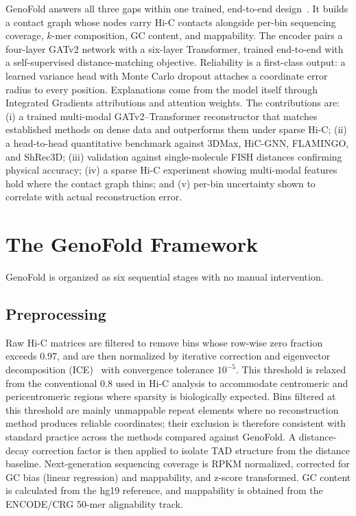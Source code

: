 \documentclass[conference]{IEEEtran}
\begin{document}
GenoFold answers all three gaps within one trained, end-to-end
design~\cite{genofold2025}. It builds a contact graph whose nodes carry
Hi-C contacts alongside per-bin sequencing coverage, $k$-mer
composition, GC content, and mappability. The encoder pairs a four-layer
GATv2 network with a six-layer Transformer, trained end-to-end with a
self-supervised distance-matching objective. Reliability is a
first-class output: a learned variance head with Monte Carlo dropout
attaches a coordinate error radius to every position. Explanations come
from the model itself through Integrated Gradients attributions and
attention weights. The contributions are: (i) a trained multi-modal
GATv2--Transformer reconstructor that matches established methods on
dense data and outperforms them under sparse Hi-C; (ii) a head-to-head
quantitative benchmark against 3DMax, HiC-GNN, FLAMINGO, and ShRec3D;
(iii) validation against single-molecule FISH distances confirming
physical accuracy; (iv) a sparse Hi-C experiment showing multi-modal
features hold where the contact graph thins; and (v) per-bin uncertainty
shown to correlate with actual reconstruction error.

\section{The GenoFold Framework}

GenoFold is organized as six sequential stages with no manual
intervention.

\subsection{Preprocessing}
Raw Hi-C matrices are filtered to remove bins whose row-wise zero
fraction exceeds 0.97, and are then normalized by iterative correction
and eigenvector decomposition (ICE)~\cite{imakaev2012} with convergence
tolerance $10^{-5}$. This threshold is relaxed from the conventional 0.8
used in Hi-C analysis to accommodate centromeric and pericentromeric
regions where sparsity is biologically expected. Bins filtered at this
threshold are mainly unmappable repeat elements where no reconstruction
method produces reliable coordinates; their exclusion is therefore
consistent with standard practice across the methods compared against
GenoFold. A distance-decay correction factor is then applied to isolate
TAD structure from the distance baseline. Next-generation sequencing
coverage is RPKM normalized, corrected for GC bias (linear regression)
and mappability, and z-score transformed. GC content is calculated from
the hg19 reference, and mappability is obtained from the ENCODE/CRG
50-mer alignability track.
\end{document}
